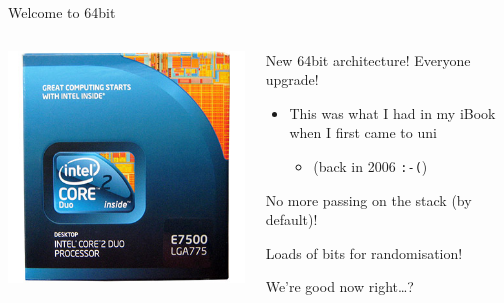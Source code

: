\documentclass[9pt,aspectratio=169]{beamer}
\begin{document}
\begin{frame}[label={sec:orgc38fcd7},fragile]{Welcome to 64bit}
 \begin{columns}
\begin{column}[t]{0.49\columnwidth}
\begin{center}
\includegraphics[width=\linewidth]{./64bit.jpg}
\end{center}
\end{column}
\begin{column}[t]{0.49\columnwidth}
New 64bit architecture!  Everyone upgrade!
\begin{itemize}
\item This was what I had in my iBook when I first came to uni
\begin{itemize}
\item (back in 2006 \texttt{:-(})
\end{itemize}
\end{itemize}

No more passing on the stack (by default)!

Loads of bits for randomisation!
\begin{block}{We're good now right\ldots{}?}
\end{block}
\end{column}
\end{columns}
\end{frame}
\end{document}
